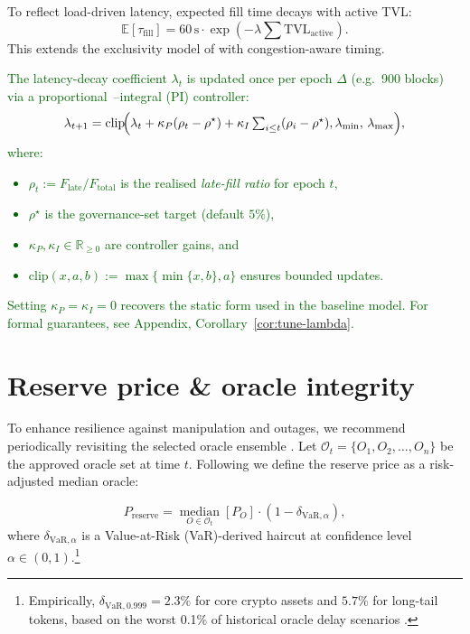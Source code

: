 \documentclass[11pt]{article}
\begin{document}
To reflect load-driven latency, expected fill time decays with active TVL:
\[
\mathbb{E}[\tau_{\text{fill}}] = 60\,\text{s} \cdot \exp\left(-\lambda \sum \text{TVL}_{\text{active}}\right).
\]
This extends the exclusivity model of \textcite{stableunit2025spec} with congestion-aware timing.
\textcolor{darkgreen}{The latency-decay coefficient \(\lambda_t\) is updated once per epoch \(\Delta\) (e.g.\ 900 blocks) via a proportional~–integral (PI) controller:
\[
\lambda_{t+1} =
\mathrm{clip}\!\Bigl(
  \lambda_t + \kappa_P(\rho_t-\rho^\star)
            + \kappa_I \textstyle\sum_{i\le t}(\rho_i-\rho^\star),
  \lambda_{\min},\,\lambda_{\max}\Bigr),
\]
where:
\begin{itemize}[itemsep=0pt,topsep=2pt,leftmargin=15pt]
  \item \(\rho_t := F_{\text{late}} / F_{\text{total}}\) is the realised \emph{late-fill ratio} for epoch \(t\),
  \item \(\rho^\star\) is the governance-set target (default \(5\%\)),
  \item \(\kappa_P, \kappa_I \in \mathbb{R}_{\ge 0}\) are controller gains, and
  \item \(\mathrm{clip}(x, a, b) := \max\{\min\{x, b\}, a\}\) ensures bounded updates.
\end{itemize}
Setting \(\kappa_P = \kappa_I = 0\) recovers the static form used in the baseline model.  
For formal guarantees, see Appendix, Corollary~\ref{cor:tune-lambda}.}

\section{Reserve price \& oracle integrity}
\label{sec:reserve}
To enhance resilience against manipulation and outages, we recommend periodically revisiting the selected oracle ensemble \parencite{deng2024safeguarding}. Let \(\mathcal{O}_t = \{O_{1}, O_{2}, \dots, O_{n}\}\) be the approved oracle set at time \(t\). Following \textcite{eskandari2021sok} we define the reserve price as a risk-adjusted median oracle:

\[
P_{\text{reserve}} = \operatorname*{median}_{O \in \mathcal{O}_t} \left[ P_{O} \right] \cdot (1 - \delta_{\text{VaR}, \alpha}),
\]
where \(\delta_{\text{VaR}, \alpha}\) is a Value-at-Risk (VaR)-derived haircut at confidence level \(\alpha \in (0,1)\).\footnote{Empirically, \(\delta_{\text{VaR}, 0.999} = 2.3\%\) for core crypto assets and \(5.7\%\) for long-tail tokens, based on the worst 0.1\% of historical oracle delay scenarios \parencite[Fig.~10]{tian2025defi}.}
\end{document}
